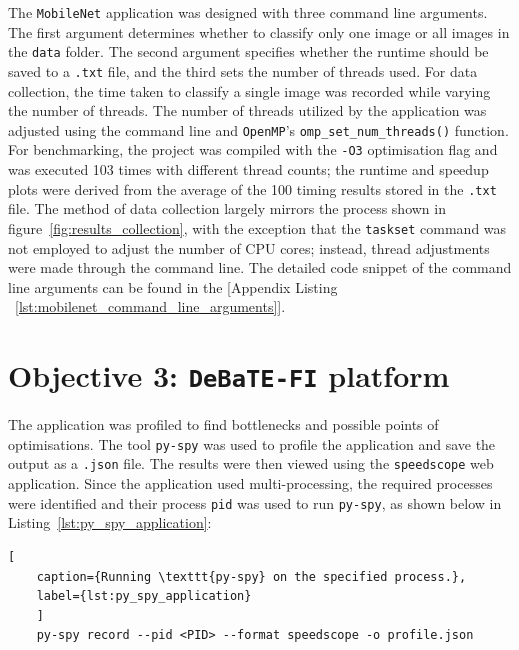 The \texttt{MobileNet} application was designed with three command line arguments. The first argument determines whether to classify only one image or all images in the \texttt{data} folder. The second argument specifies whether the runtime should be saved to a \texttt{.txt} file, and the third sets the number of threads used. For data collection, the time taken to classify a single image was recorded while varying the number of threads. The number of threads utilized by the application was adjusted using the command line and \texttt{OpenMP}'s \texttt{omp\_set\_num\_threads()} function. For benchmarking, the project was compiled with the \texttt{-O3} optimisation flag and was executed 103 times with different thread counts; the runtime and speedup plots were derived from the average of the 100 timing results stored in the \texttt{.txt} file. The method of data collection largely mirrors the process shown in figure~\ref{fig:results_collection}, with the exception that the \texttt{taskset} command was not employed to adjust the number of CPU cores; instead, thread adjustments were made through the command line. The detailed code snippet of the command line arguments can be found in the [Appendix Listing ~\ref{lst:mobilenet_command_line_arguments}].  

\section{Objective 3: \texttt{DeBaTE-FI} platform}

The application was profiled to find bottlenecks and possible points of optimisations. The tool \texttt{py-spy} was used to profile the application and save the output as a \texttt{.json} file\cite{py-spy}. The results were then viewed using the \texttt{speedscope} web application\cite{speedscope_app}. Since the application used multi-processing, the required processes were identified and their process \texttt{pid} was used to run \texttt{py-spy}, as shown below in Listing~\ref{lst:py_spy_application}:

\begin{lstlisting}[
	caption={Running \texttt{py-spy} on the specified process.},
	label={lst:py_spy_application}
	]
	py-spy record --pid <PID> --format speedscope -o profile.json 
\end{lstlisting}


